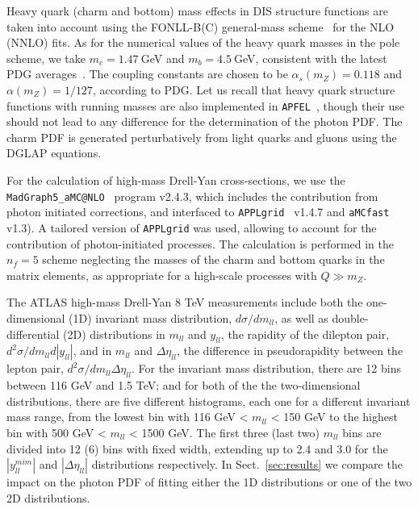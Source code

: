 Heavy quark (charm and bottom) mass effects in DIS structure functions are taken into account
using the FONLL-B(C) general-mass scheme~\cite{Forte:2010ta}
for the NLO (NNLO) fits.
%
As for the numerical values of the heavy quark masses in the pole scheme,
we take  $m_c=1.47~$GeV and $m_b=4.5~$GeV, consistent with the latest
PDG averages~\cite{Agashe:2014kda}.
%
The coupling constants are chosen to be  $\alpha_s(m_Z)=0.118$ and 
$\alpha(m_Z)=1/127$, according to PDG.
Let us recall that heavy quark structure functions with running masses
are also implemented in {\tt APFEL}~\cite{Bertone:2016ywq},
though their use should not lead to any difference for the determination of the photon PDF.
%
The charm PDF is generated perturbatively from light quarks and gluons using
the DGLAP equations.

For the calculation of high-mass Drell-Yan cross-sections,
we use the {\tt MadGraph5{\_}aMC@NLO}~\cite{Alwall:2014hca} program  v2.4.3,
which includes the contribution from photon initiated corrections,
and interfaced to {\tt APPLgrid}~\cite{Carli:2010rw} v1.4.7
and {\tt aMCfast}~\cite{amcfast} v1.3).
%
A tailored version of  {\tt APPLgrid} was used, allowing to account for
the contribution of photon-initiated processes.
%
The calculation is performed in the $n_f=5$ scheme neglecting the masses of the charm
and bottom quarks in the matrix elements, as appropriate for a high-scale processes
with $Q \gg m_Z$.

The ATLAS high-mass Drell-Yan 8 TeV measurements include both the one-dimensional (1D)
invariant mass distribution, $d\sigma/dm_{ll}$, as well as double-differential (2D)
distributions in $m_{ll}$ and $y_{ll}$, the rapidity of the dilepton pair,
$d^{2}\sigma/dm_{ll}d|y_{ll}|$, and in $m_{ll}$ and $\Delta\eta_{ll}$,
  the difference in 
  pseudorapidity between the lepton pair, $d^{2}\sigma/dm_{ll}\Delta\eta_{ll}$.
  For the invariant mass 
  distribution, there are 12 bins between 116 GeV and 1.5 TeV; and for both of the 
 the two-dimensional distributions, there are five different histograms, each one for a different invariant
 mass range, from the lowest bin
 with 116 GeV < $m_{ll}$ < 150 GeV to the highest bin with 500 GeV < $m_{ll}$ < 1500 GeV.
 The first three (last two) $m_{ll}$ bins are divided into 12 (6) bins with fixed
 width, extending up to 2.4 and 3.0 for the  $|y_{ll}^{mim}|$ and $|\Delta\eta_{ll}|$ distributions
 respectively.
 In Sect.~\ref{sec:results} we compare the impact on the photon PDF of fitting either
 the 1D distributions or one of the two 2D distributions.

